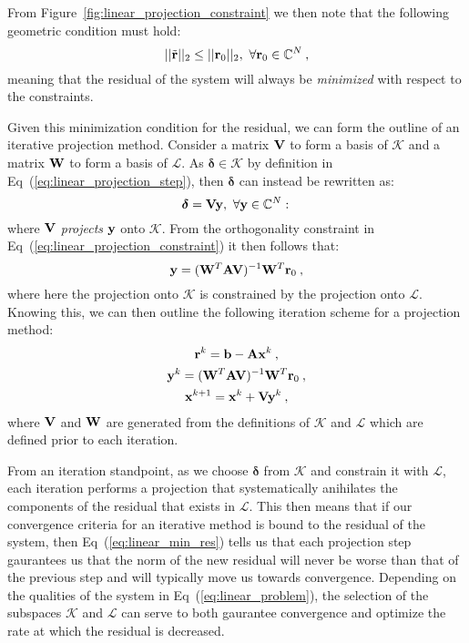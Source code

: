 From Figure~\ref{fig:linear_projection_constraint} we then note that
the following geometric condition must hold:
\begin{equation}
  ||\tilde{\ve{r}}||_2 \leq ||\ve{r}_0||_2,\ \forall \ve{r}_0 \in
  \mathbb{C}^N\:,
  \label{eq:linear_min_res}
\end{equation}
meaning that the residual of the system will always be
\textit{minimized} with respect to the constraints.

Given this minimization condition for the residual, we can form the
outline of an iterative projection method. Consider a matrix $\mathbf{V}$
to form a basis of $\mathcal{K}$ and a matrix $\mathbf{W}$ to form a basis
of $\mathcal{L}$. As $\boldsymbol{\delta} \in \mathcal{K}$ by
definition in Eq~(\ref{eq:linear_projection_step}), then
$\boldsymbol{\delta}$ can instead be rewritten as:
\begin{equation}
  \boldsymbol{\delta} = \mathbf{V}\mathbf{y},\ \forall \mathbf{y} \in \mathbb{C}^N:\,
  \label{eq:linear_delta_projection}
\end{equation}
where $\mathbf{V}$ \textit{projects} $\mathbf{y}$ onto $\mathcal{K}$. From the
orthogonality constraint in Eq~(\ref{eq:linear_projection_constraint})
it then follows that:
\begin{equation}
  \mathbf{y} = (\mathbf{W}^T\mathbf{A}\mathbf{V})^{-1}\mathbf{W}^T\mathbf{r}_0\:,
  \label{eq:linear_constraint_projection}
\end{equation}
where here the projection onto $\mathcal{K}$ is constrained by the
projection onto $\mathcal{L}$. Knowing this, we can then outline the
following iteration scheme for a projection method:
\begin{subequations}
  \begin{gather}
    \mathbf{r}^k = \mathbf{b} - \mathbf{A}\mathbf{x}^k\:,\\  
    \mathbf{y}^k = (\mathbf{W}^T\mathbf{A}\mathbf{V})^{-1}\mathbf{W}^T\mathbf{r}_0\:,\\
    \mathbf{x}^{k+1} = \mathbf{x}^k + \mathbf{V}\mathbf{y}^k\:,
  \end{gather}
  \label{eq:linear_projection_iteration}
\end{subequations}
where $\mathbf{V}$ and $\mathbf{W}$ are generated from the definitions of
$\mathcal{K}$ and $\mathcal{L}$ which are defined prior to each
iteration.

From an iteration standpoint, as we choose $\boldsymbol{\delta}$ from
$\mathcal{K}$ and constrain it with $\mathcal{L}$, each iteration
performs a projection that systematically anihilates the components of
the residual that exists in $\mathcal{L}$. This then means that if our
convergence criteria for an iterative method is bound to the residual
of the system, then Eq~(\ref{eq:linear_min_res}) tells us that each
projection step gaurantees us that the norm of the new residual will
never be worse than that of the previous step and will typically move
us towards convergence. Depending on the qualities of the system in
Eq~(\ref{eq:linear_problem}), the selection of the subspaces
$\mathcal{K}$ and $\mathcal{L}$ can serve to both gaurantee
convergence and optimize the rate at which the residual is decreased.

